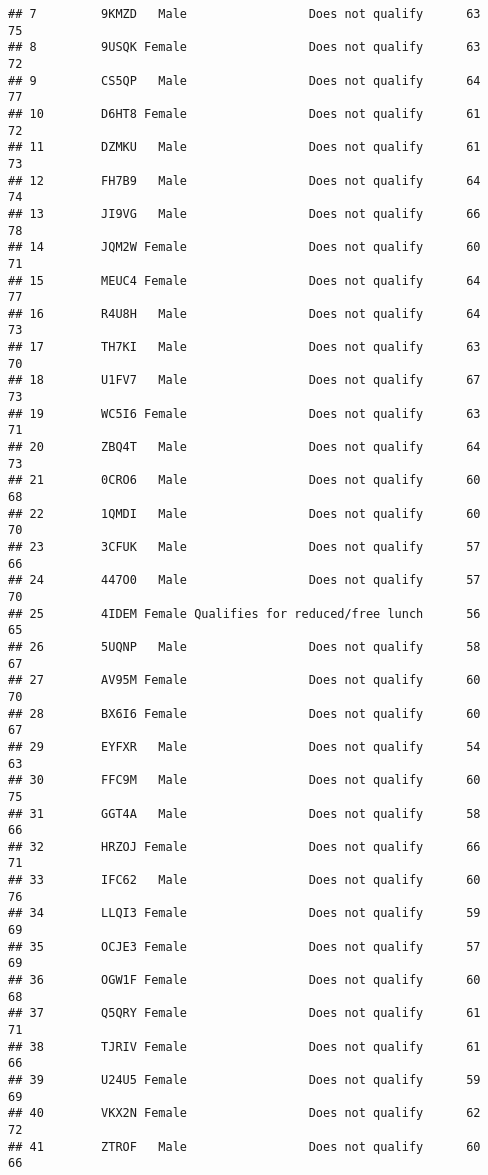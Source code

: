 \documentclass[
]{article}
\begin{document}
\begin{verbatim}
## 7         9KMZD   Male                 Does not qualify      63       75
## 8         9USQK Female                 Does not qualify      63       72
## 9         CS5QP   Male                 Does not qualify      64       77
## 10        D6HT8 Female                 Does not qualify      61       72
## 11        DZMKU   Male                 Does not qualify      61       73
## 12        FH7B9   Male                 Does not qualify      64       74
## 13        JI9VG   Male                 Does not qualify      66       78
## 14        JQM2W Female                 Does not qualify      60       71
## 15        MEUC4 Female                 Does not qualify      64       77
## 16        R4U8H   Male                 Does not qualify      64       73
## 17        TH7KI   Male                 Does not qualify      63       70
## 18        U1FV7   Male                 Does not qualify      67       73
## 19        WC5I6 Female                 Does not qualify      63       71
## 20        ZBQ4T   Male                 Does not qualify      64       73
## 21        0CRO6   Male                 Does not qualify      60       68
## 22        1QMDI   Male                 Does not qualify      60       70
## 23        3CFUK   Male                 Does not qualify      57       66
## 24        447O0   Male                 Does not qualify      57       70
## 25        4IDEM Female Qualifies for reduced/free lunch      56       65
## 26        5UQNP   Male                 Does not qualify      58       67
## 27        AV95M Female                 Does not qualify      60       70
## 28        BX6I6 Female                 Does not qualify      60       67
## 29        EYFXR   Male                 Does not qualify      54       63
## 30        FFC9M   Male                 Does not qualify      60       75
## 31        GGT4A   Male                 Does not qualify      58       66
## 32        HRZOJ Female                 Does not qualify      66       71
## 33        IFC62   Male                 Does not qualify      60       76
## 34        LLQI3 Female                 Does not qualify      59       69
## 35        OCJE3 Female                 Does not qualify      57       69
## 36        OGW1F Female                 Does not qualify      60       68
## 37        Q5QRY Female                 Does not qualify      61       71
## 38        TJRIV Female                 Does not qualify      61       66
## 39        U24U5 Female                 Does not qualify      59       69
## 40        VKX2N Female                 Does not qualify      62       72
## 41        ZTROF   Male                 Does not qualify      60       66

\end{verbatim}
\end{document}
